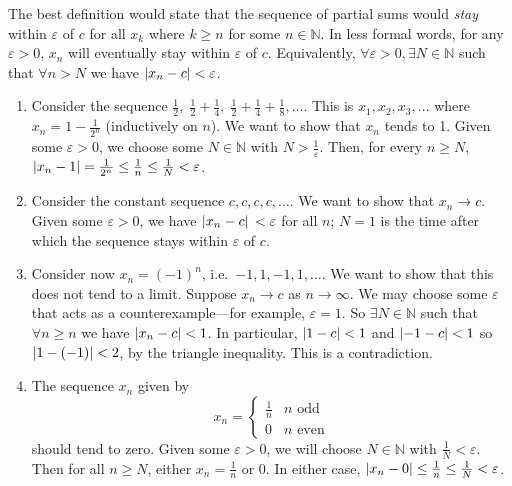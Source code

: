 The best definition would state that the sequence of partial sums would \textit{stay} within \(\varepsilon\) of \(c\) for all \(x_k\) where \(k \geq n\) for some \(n \in \mathbb N\).
In less formal words, for any \(\varepsilon > 0\), \(x_n\) will eventually stay within \(\varepsilon\) of \(c\).
Equivalently, \(\forall \varepsilon > 0, \exists N \in \mathbb N\) such that \(\forall n > N\) we have \(\abs{x_n - c} < \varepsilon\).
\begin{enumerate}
	\item Consider the sequence \(\frac{1}{2},\; \frac{1}{2} + \frac{1}{4},\; \frac{1}{2} + \frac{1}{4} + \frac{1}{8}, \dots\).
	      This is \(x_1, x_2, x_3, \dots\) where \(x_n = 1 - \frac{1}{2^n}\) (inductively on \(n\)).
	      We want to show that \(x_n\) tends to 1.
	      Given some \(\varepsilon > 0\), we choose some \(N \in \mathbb N\) with \(N > \frac{1}{\varepsilon}\).
	      Then, for every \(n \geq N\), \(\abs{x_n - 1} = \frac{1}{2^n} \leq \frac{1}{n} \leq \frac{1}{N} < \varepsilon\).
	\item Consider the constant sequence \(c, c, c, c, \dots\).
	      We want to show that \(x_n \to c\).
	      Given some \(\varepsilon > 0\), we have \(\abs*{x_n - c} < \varepsilon\) for all \(n\); \(N=1\) is the time after which the sequence stays within \(\varepsilon\) of \(c\).
	\item Consider now \(x_n = (-1)^n\), i.e.\ \(-1, 1, -1, 1, \dots\).
	      We want to show that this does not tend to a limit.
	      Suppose \(x_n \to c\) as \(n \to \infty\).
	      We may choose some \(\varepsilon\) that acts as a counterexample---for example, \(\varepsilon = 1\).
	      So \(\exists N \in \mathbb N\) such that \(\forall n \geq n\) we have \(\abs{x_n - c} < 1\).
	      In particular, \(\abs{1 - c} < 1\) and \(\abs{-1 - c} < 1\) so \(\abs{1 - (-1)} < 2\), by the triangle inequality.
	      This is a contradiction.
	\item The sequence \(x_n\) given by
	      \[
		      x_n = \begin{cases}
			      \frac{1}{n} & n \text{ odd}  \\
			      0           & n \text{ even}
		      \end{cases}
	      \]
	      should tend to zero.
	      Given some \(\varepsilon > 0\), we will choose \(N \in \mathbb N\) with \(\frac{1}{N} < \varepsilon\).
	      Then for all \(n \geq N\), either \(x_n = \frac{1}{n}\) or 0.
	      In either case, \(\abs{x_n - 0} \leq \frac{1}{n} \leq \frac{1}{N} < \varepsilon\).
\end{enumerate}
